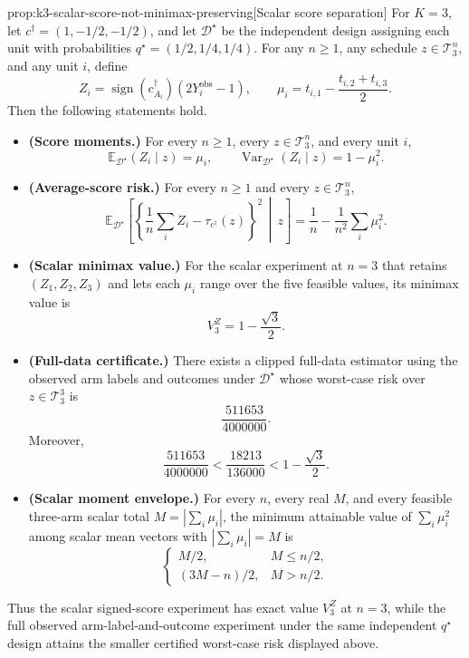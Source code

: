 \documentclass[11pt]{article}
\begin{document}
\begin{propositionv}{prop:k3-scalar-score-not-minimax-preserving}[Scalar score separation]
For \(K=3\), let \(c^\dagger=(1,-1/2,-1/2)\), and let \(\mathcal D^\star\) be the independent design assigning each unit with probabilities \(q^\star=(1/2,1/4,1/4)\).  For any \(n\geq 1\), any schedule \(z\in\mathcal T_3^n\), and any unit \(i\), define
\[
Z_i=\operatorname{sign}(c^\dagger_{A_i})(2Y_i^{\mathrm{obs}}-1),
\qquad
\mu_i=t_{i,1}-\frac{t_{i,2}+t_{i,3}}{2}.
\]
Then the following statements hold.
\begin{itemize}
\item \textbf{(Score moments.)}  For every \(n\geq 1\), every \(z\in\mathcal T_3^n\), and every unit \(i\),
\[
\mathbb E_{\mathcal D^\star}(Z_i\mid z)=\mu_i,
\qquad
\operatorname{Var}_{\mathcal D^\star}(Z_i\mid z)=1-\mu_i^2 .
\]
\item \textbf{(Average-score risk.)}  For every \(n\geq 1\) and every \(z\in\mathcal T_3^n\),
\[
\mathbb E_{\mathcal D^\star}\!\left[
\left\{\frac{1}{n}\sum_i Z_i-\tau_{c^\dagger}(z)\right\}^2
\,\middle|\, z\right]
=
\frac{1}{n}-\frac{1}{n^2}\sum_i \mu_i^2 .
\]
\item \textbf{(Scalar minimax value.)}  For the scalar experiment at \(n=3\) that retains \((Z_1,Z_2,Z_3)\) and lets each \(\mu_i\) range over the five feasible values, its minimax value is
\[
V_3^Z=1-\frac{\sqrt 3}{2}.
\]
\item \textbf{(Full-data certificate.)}  There exists a clipped full-data estimator using the observed arm labels and outcomes under \(\mathcal D^\star\) whose worst-case risk over \(z\in\mathcal T_3^3\) is
\[
\frac{511653}{4000000}.
\]
Moreover,
\[
\frac{511653}{4000000}
<
\frac{18213}{136000}
<
1-\frac{\sqrt 3}{2}.
\]
\item \textbf{(Scalar moment envelope.)}  For every \(n\), every real \(M\), and every feasible three-arm scalar total \(M=|\sum_i\mu_i|\), the minimum attainable value of \(\sum_i\mu_i^2\) among scalar mean vectors with \(|\sum_i\mu_i|=M\) is
\[
\begin{cases}
M/2, & M\leq n/2,\\
(3M-n)/2, & M>n/2.
\end{cases}
\]
\end{itemize}
Thus the scalar signed-score experiment has exact value \(V_3^Z\) at \(n=3\), while the full observed arm-label-and-outcome experiment under the same independent \(q^\star\) design attains the smaller certified worst-case risk displayed above.
\end{propositionv}
\end{document}
